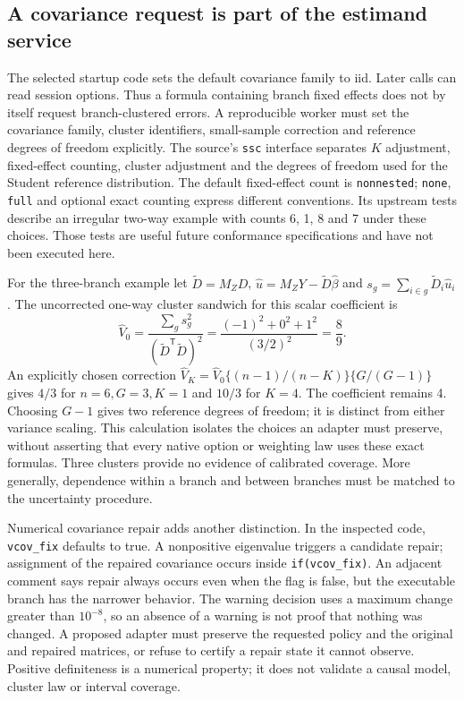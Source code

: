 \subsection{A covariance request is part of the estimand service}
\label{exec20:fx-covariance}
The selected startup code sets the default covariance family to iid. Later
calls can read session options. Thus a formula containing branch fixed effects
does not by itself request branch-clustered errors. A reproducible worker
must set the covariance family, cluster identifiers, small-sample correction
and reference degrees of freedom explicitly. The source's \texttt{ssc}
interface separates $K$ adjustment, fixed-effect counting, cluster adjustment
and the degrees of freedom used for the Student reference distribution.
The default fixed-effect count is \texttt{nonnested}; \texttt{none},
\texttt{full} and optional exact counting express different conventions.
Its upstream tests describe an irregular two-way example with counts 6, 1,
8 and 7 under these choices. Those tests are useful future conformance
specifications and have not been executed here.\citep{exec20_fixest_source}

For the three-branch example let $\widetilde D=M_ZD$,
$\widehat u=M_ZY-\widetilde D\widehat\beta$ and
$s_g=\sum_{i\in g}\widetilde D_i\widehat u_i$. The uncorrected one-way
cluster sandwich for this scalar coefficient is
\begin{equation}
 \widehat V_0=\frac{\sum_gs_g^2}{(\widetilde D^{\mathsf T}\widetilde D)^2}
 =\frac{(-1)^2+0^2+1^2}{(3/2)^2}=\frac89.
 \label{exec20:fx-cluster}
\end{equation}
An explicitly chosen correction
$\widehat V_K=\widehat V_0\{(n-1)/(n-K)\}\{G/(G-1)\}$ gives
$4/3$ for $n=6,G=3,K=1$ and $10/3$ for $K=4$. The coefficient remains 4.
Choosing $G-1$ gives two reference degrees of freedom; it is distinct from
either variance scaling. This calculation isolates the choices an adapter
must preserve, without asserting that every native option or weighting law
uses these exact formulas. Three clusters provide no evidence of calibrated
coverage. More generally, dependence within a branch and between branches
must be matched to the uncertainty procedure.\citep{exec20_fixest_reference}

Numerical covariance repair adds another distinction. In the inspected code,
\texttt{vcov\_fix} defaults to true. A nonpositive eigenvalue triggers a
candidate repair; assignment of the repaired covariance occurs inside
\texttt{if(vcov\_fix)}. An adjacent comment says repair always occurs even
when the flag is false, but the executable branch has the narrower behavior.
The warning decision uses a maximum change greater than $10^{-8}$, so an
absence of a warning is not proof that nothing was changed. A proposed
adapter must preserve the requested policy and the original and repaired
matrices, or refuse to certify a repair state it cannot observe. Positive
definiteness is a numerical property; it does not validate a causal model,
cluster law or interval coverage.\citep{exec20_fixest_source}

